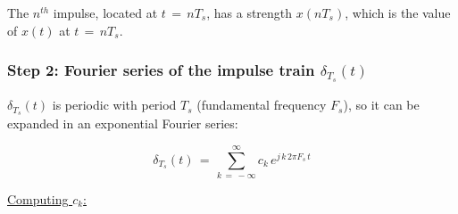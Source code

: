 The $n^{th}$ impulse, located at $t \, = \, n T_s$, has a strength $x(n T_s)$, which is the value of $x(t)$ at $t \, = \, n T_s$.

\subsubsection*{Step 2: Fourier series of the impulse train $\delta_{T_s}(t)$}

$\delta_{T_s}(t)$ is periodic with period $T_s$ (fundamental frequency $F_s$), so it can be expanded in an exponential Fourier series:

\begin{equation}
\delta_{T_s}(t) \, = \, \sum_{k \, = \, -\infty}^{\infty} c_k \, e^{j \, k \, 2 \pi F_s \, t}
\end{equation}

\underline{Computing $c_k$:}

